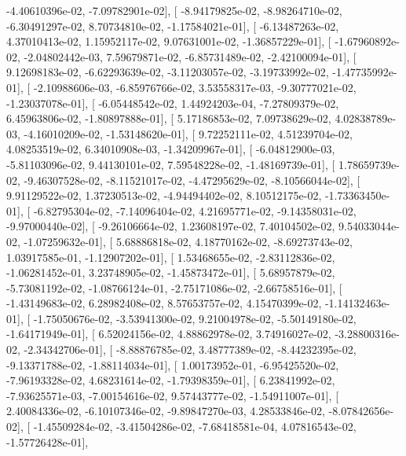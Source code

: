 \documentclass{article}
\begin{document}
         -4.40610396e-02,  -7.09782901e-02],
       [ -8.94179825e-02,  -8.98264710e-02,  -6.30491297e-02,
          8.70734810e-02,  -1.17584021e-01],
       [ -6.13487263e-02,   4.37010413e-02,   1.15952117e-02,
          9.07631001e-02,  -1.36857229e-01],
       [ -1.67960892e-02,  -2.04802442e-03,   7.59679871e-02,
         -6.85731489e-02,  -2.42100094e-01],
       [  9.12698183e-02,  -6.62293639e-02,  -3.11203057e-02,
         -3.19733992e-02,  -1.47735992e-01],
       [ -2.10988606e-03,  -6.85976766e-02,   3.53558317e-03,
         -9.30777021e-02,  -1.23037078e-01],
       [ -6.05448542e-02,   1.44924203e-04,  -7.27809379e-02,
          6.45963806e-02,  -1.80897888e-01],
       [  5.17186853e-02,   7.09738629e-02,   4.02838789e-03,
         -4.16010209e-02,  -1.53148620e-01],
       [  9.72252111e-02,   4.51239704e-02,   4.08253519e-02,
          6.34010908e-03,  -1.34209967e-01],
       [ -6.04812900e-03,  -5.81103096e-02,   9.44130101e-02,
          7.59548228e-02,  -1.48169739e-01],
       [  1.78659739e-02,  -9.46307528e-02,  -8.11521017e-02,
         -4.47295629e-02,  -8.10566044e-02],
       [  9.91129522e-02,   1.37230513e-02,  -4.94494402e-02,
          8.10512175e-02,  -1.73363450e-01],
       [ -6.82795304e-02,  -7.14096404e-02,   4.21695771e-02,
         -9.14358031e-02,  -9.97000440e-02],
       [ -9.26106664e-02,   1.23608197e-02,   7.40104502e-02,
          9.54033044e-02,  -1.07259632e-01],
       [  5.68886818e-02,   4.18770162e-02,  -8.69273743e-02,
          1.03917585e-01,  -1.12907202e-01],
       [  1.53468655e-02,  -2.83112836e-02,  -1.06281452e-01,
          3.23748905e-02,  -1.45873472e-01],
       [  5.68957879e-02,  -5.73081192e-02,  -1.08766124e-01,
         -2.75171086e-02,  -2.66758516e-01],
       [ -1.43149683e-02,   6.28982408e-02,   8.57653757e-02,
          4.15470399e-02,  -1.14132463e-01],
       [ -1.75050676e-02,  -3.53941300e-02,   9.21004978e-02,
         -5.50149180e-02,  -1.64171949e-01],
       [  6.52024156e-02,   4.88862978e-02,   3.74916027e-02,
         -3.28800316e-02,  -2.34342706e-01],
       [ -8.88876785e-02,   3.48777389e-02,  -8.44232395e-02,
         -9.13371788e-02,  -1.88114034e-01],
       [  1.00173952e-01,  -6.95425520e-02,  -7.96193328e-02,
          4.68231614e-02,  -1.79398359e-01],
       [  6.23841992e-02,  -7.93625571e-03,  -7.00154616e-02,
          9.57443777e-02,  -1.54911007e-01],
       [  2.40084336e-02,  -6.10107346e-02,  -9.89847270e-03,
          4.28533846e-02,  -8.07842656e-02],
       [ -1.45509284e-02,  -3.41504286e-02,  -7.68418581e-04,
          4.07816543e-02,  -1.57726428e-01],
\end{document}
